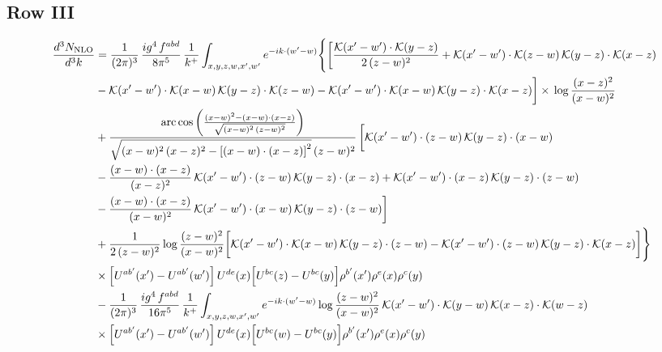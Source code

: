 \documentclass[9pt]{article}
\numberwithin{equation}{section}
\begin{document}
\subsection{Row III}
\begin{align}
\frac{d^{3}N_{\rm NLO}}{d^{3}k} &=\frac{1}{(2\pi)^{3}}\,\frac{ig^{4}\,f^{abd}}{8\pi^{5}}\,\frac{1}{k^{+}}\int_{x,y,z,w,x',w'}e^{-ik\cdot(w'-w)}\Bigg\{\bigg[\frac{\mathcal{K}(x'-w')\cdot\mathcal{K}(y-z)}{2\,(z-w)^{2}}+\mathcal{K}(x'-w')\cdot\mathcal{K}(z-w)\,\mathcal{K}(y-z)\cdot\mathcal{K}(x-z)\notag \\
&-\mathcal{K}(x'-w')\cdot\mathcal{K}(x-w)\,\mathcal{K}(y-z)\cdot\mathcal{K}(z-w)-\mathcal{K}(x'-w')\cdot\mathcal{K}(x-w)\,\mathcal{K}(y-z)\cdot\mathcal{K}(x-z)\bigg]\times\, \log\frac{(x-z)^{2}}{(x-w)^{2}}\notag \\
&+\frac{\mathrm{arc\,cos}\left(\frac{(x-w)^{2}-(x-w)\cdot (x-z)}{\sqrt{(x-w)^{2}\,(z-w)^{2}}}\right)}{\sqrt{(x-w)^{2}\,(x-z)^{2}-\left[(x-w)\cdot (x-z)\right]^{2}}\,(z-w)^{2}}\,\bigg[\mathcal{K}(x'-w')\cdot(z-w)\,\mathcal{K}(y-z)\cdot(x-w)\notag \\ & -\frac{(x-w)\cdot(x-z)}{(x-z)^{2}}\,\mathcal{K}(x'-w')\cdot(z-w)\,\mathcal{K}(y-z)\cdot(x-z)+\mathcal{K}(x'-w')\cdot(x-z)\,\mathcal{K}(y-z)\cdot(z-w)\notag \\ & -\frac{(x-w)\cdot(x-z)}{(x-w)^{2}}\,\mathcal{K}(x'-w')\cdot(x-w)\,\mathcal{K}(y-z)\cdot(z-w)\bigg]\notag \\
&+\frac{1}{2\,(z-w)^{2}}\log\frac{(z-w)^{2}}{(x-w)^{2}}\bigg[\mathcal{K}(x'-w')\cdot\mathcal{K}(x-w)\,\mathcal{K}(y-z)\cdot(z-w)-\mathcal{K}(x'-w')\cdot(z-w)\,\mathcal{K}(y-z)\cdot\mathcal{K}(x-z)\bigg]\Bigg\}\notag\\
&\times\Big[U^{ab'}(x')-U^{ab'}(w')\Big]\,U^{de}(x)\Big[U^{bc}(z)-U^{bc}(y)\Big]\rho^{b'}(x')\rho^{e}(x)\rho^{c}(y)\notag\\
&-\frac{1}{(2\pi)^{3}}\,\frac{ig^{4}\,f^{abd}}{16\pi^{5}}\,\frac{1}{k^{+}}\int_{x,y,z,w,x',w'}e^{-ik\cdot(w'-w)}\log\frac{(z-w)^{2}}{(x-w)^{2}}\,\mathcal{K}(x'-w')\cdot\mathcal{K}(y-w)\,\mathcal{K}(x-z)\cdot\mathcal{K}(w-z)\notag\\
&\times\Big[U^{ab'}(x')-U^{ab'}(w')\Big]\,U^{de}(x)\Big[U^{bc}(w)-U^{bc}(y)\Big]\rho^{b'}(x')\rho^{e}(x)\rho^{c}(y)
\end{align}
\end{document}

